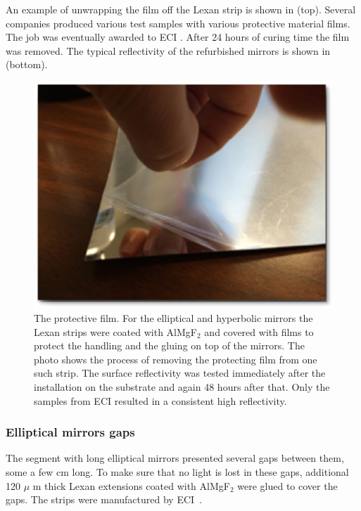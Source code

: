 An example of unwrapping the film off the Lexan strip is shown in  (top). Several companies produced various test samples with
various protective material films. The job was eventually awarded to ECI \cite{ECI}.
After 24 hours of curing time the film was removed.
The typical reflectivity of the refurbished mirrors is shown in  (bottom).


\begin{figure}[ht]
\centering
	\includegraphics[width=0.98\columnwidth,keepaspectratio]{img/filmOnStrip.png}
	\caption{The protective film. For the elliptical and hyperbolic mirrors the Lexan strips were coated with AlMgF$_2$
				and covered with films to protect the handling and the
				gluing on top of the mirrors. The photo shows the process of removing the
            protecting film from one such strip. The surface reflectivity was tested immediately after the installation on the substrate and again
            48 hours after that. Only the samples from ECI \cite{ECI} resulted in a consistent high reflectivity. }
	\label{fig:filmOnStrip}
\end{figure}


\subsubsection{Elliptical mirrors gaps}

The segment with long elliptical mirrors presented several gaps between them, some a few cm long. To make sure that no light is lost in these gaps,
additional 120 $\mu$ m thick Lexan extensions coated with AlMgF$_2$ were glued to cover the gaps. The strips were manufactured by ECI~\cite{ECI}.


